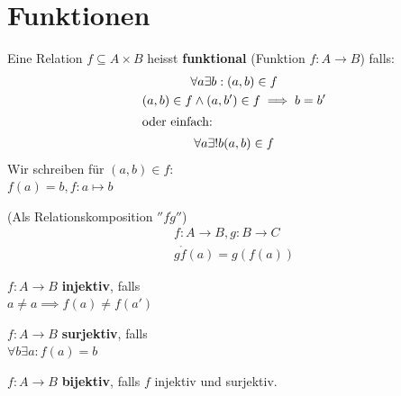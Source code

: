 \section{Funktionen}
\begin{def*}[note = Funktion , index = Funktion]
	Eine Relation $f \subseteq A \times B$ heisst \textbf{funktional} (Funktion $f: A \rightarrow B$) falls:
	\begin{gather*}
		\forall a \exists b : (a,b) \in f \\
		(a,b) \in f \wedge (a,b') \in f \implies b = b' \\
		\intertext{oder einfach:}
		\forall a \exists ! b (a,b) \in f
	\end{gather*}
	Wir schreiben für $(a,b) \in f$: \\
	$f( a ) = b , f: a \mapsto b$
\end{def*}
\begin{def*}[note = Komposition , index = Komposition]
	(Als Relationskomposition $''f \ring g''$) \\
	\begin{gather*}
		f: A \rightarrow B, g: B \rightarrow C \\
		g \ring f( a ) = g( f( a ))
	\end{gather*}
\end{def*}
\begin{def*}[note = Injektivität , index = Injektivität]
	$f: A \rightarrow B$ \textbf{injektiv}, falls \\
	$a \neq a \implies f( a ) \neq f( a' )$
\end{def*}
\begin{def*}[note = Surjektivität , index = Surjektivität]
	$f: A \rightarrow B$ \textbf{surjektiv}, falls \\
	$\forall b \exists a : f( a ) = b$
\end{def*}
\begin{def*}[note = Bijektivität , index = Bijektivität]
	$f: A \rightarrow B$ \textbf{bijektiv}, falls $f$ injektiv und surjektiv. 
\end{def*}

